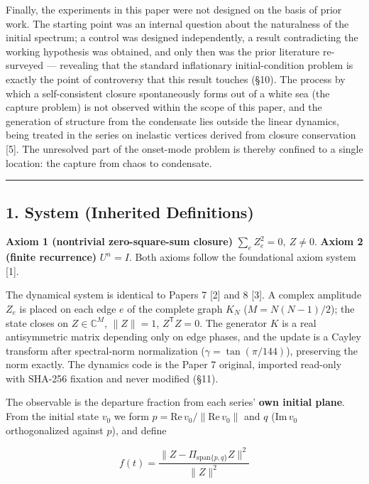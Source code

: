 \documentclass[
  a4paper,
]{article}
\begin{document}
Finally, the experiments in this paper were not designed on the basis of
prior work. The starting point was an internal question about the
naturalness of the initial spectrum; a control was designed
independently, a result contradicting the working hypothesis was
obtained, and only then was the prior literature re-surveyed ---
revealing that the standard inflationary initial-condition problem is
exactly the point of controversy that this result touches (§10). The
process by which a self-consistent closure spontaneously forms out of a
white sea (the capture problem) is not observed within the scope of this
paper, and the generation of structure from the condensate lies outside
the linear dynamics, being treated in the series on inelastic vertices
derived from closure conservation {[}5{]}. The unresolved part of the
onset-mode problem is thereby confined to a single location: the capture
from chaos to condensate.

\begin{center}\rule{0.5\linewidth}{0.5pt}\end{center}

\subsection{1. System (Inherited
Definitions)}\label{system-inherited-definitions}

\textbf{Axiom 1 (nontrivial zero-square-sum closure)}
\(\sum_e Z_e^2=0,\ Z\neq0\). \textbf{Axiom 2 (finite recurrence)}
\(U^n=I\). Both axioms follow the foundational axiom system {[}1{]}.

The dynamical system is identical to Papers 7 {[}2{]} and 8 {[}3{]}. A
complex amplitude \(Z_e\) is placed on each edge \(e\) of the complete
graph \(K_N\) (\(M=N(N-1)/2\)); the state closes on \(Z\in\mathbb C^M\),
\(\lVert Z\rVert=1\), \(Z^{\mathsf T}Z=0\). The generator \(K\) is a
real antisymmetric matrix depending only on edge phases, and the update
is a Cayley transform after spectral-norm normalization
(\(\gamma=\tan(\pi/144)\)), preserving the norm exactly. The dynamics
code is the Paper 7 original, imported read-only with SHA-256 fixation
and never modified (§11).

The observable is the departure fraction from each series' \textbf{own
initial plane}. From the initial state \(v_0\) we form
\(p=\mathrm{Re}\,v_0/\lVert\mathrm{Re}\,v_0\rVert\) and \(q\)
(\(\mathrm{Im}\,v_0\) orthogonalized against \(p\)), and define

\[f(t)=\frac{\lVert Z-\Pi_{\mathrm{span}\{p,q\}}Z\rVert^2}{\lVert Z\rVert^2}\]
\end{document}
